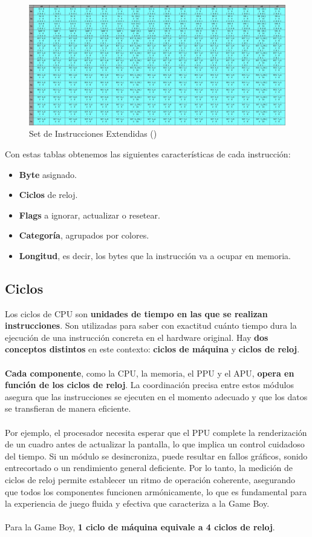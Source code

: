 \begin{figure}[H]
\centering
\includegraphics[width=1\textwidth]{include/images/opcodes_2.jpg}
\caption{Set de Instrucciones Extendidas (\cite{opcodes})}
\label{figure:opcodes_2}
\end{figure}

Con estas tablas obtenemos las siguientes características de cada instrucción:
\begin{itemize}
    \item \textbf{Byte} asignado.
    \item \textbf{Ciclos} de reloj.
    \item \textbf{Flags} a ignorar, actualizar o resetear.
    \item \textbf{Categoría}, agrupados por colores.
    \item \textbf{Longitud}, es decir, los bytes que la instrucción va a ocupar en memoria.
\end{itemize}

\subsection{Ciclos}

Los ciclos de CPU son \textbf{unidades de tiempo en las que se realizan instrucciones}. Son utilizadas para saber con exactitud cuánto tiempo dura la ejecución de una instrucción concreta en el hardware original. Hay \textbf{dos conceptos distintos} en este contexto: \textbf{ciclos de máquina} y \textbf{ciclos de reloj}.
\\\\
\textbf{Cada componente}, como la CPU, la memoria, el PPU y el APU, \textbf{opera en función de los ciclos de reloj}. La coordinación precisa entre estos módulos asegura que las instrucciones se ejecuten en el momento adecuado y que los datos se transfieran de manera eficiente.
\\\\
Por ejemplo, el procesador necesita esperar que el PPU complete la renderización de un cuadro antes de actualizar la pantalla, lo que implica un control cuidadoso del tiempo. Si un módulo se desincroniza, puede resultar en fallos gráficos, sonido entrecortado o un rendimiento general deficiente. Por lo tanto, la medición de ciclos de reloj permite establecer un ritmo de operación coherente, asegurando que todos los componentes funcionen armónicamente, lo que es fundamental para la experiencia de juego fluida y efectiva que caracteriza a la Game Boy.
\\\\
Para la Game Boy, \textbf{1 ciclo de máquina equivale a 4 ciclos de reloj}.

